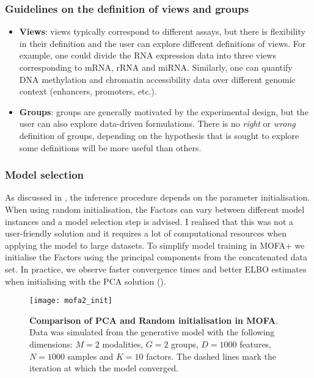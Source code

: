 \subsubsection{Guidelines on the definition of views and groups} \label{section:mofa2_guidelines_views_groups}

\begin{itemize}
	\item \textbf{Views}: views typically correspond to different assays, but there is flexibility in their definition and the user can explore different definitions of views. For example, one could divide the RNA expression data into three views corresponding to mRNA, rRNA and miRNA. Similarly, one can quantify DNA methylation and chromatin accessibility data over different genomic context (enhancers, promoters, etc.).

	\item \textbf{Groups}: groups are generally motivated by the experimental design, but the user can also explore data-driven formulations. There is no \textit{right} or \textit{wrong} definition of groups, depending on the hypothesis that is sought to explore some definitions will be more useful than others.
\end{itemize}

\subsubsection{Model selection} \label{section:mofa2_model_selection}

As discussed in , the inference procedure depends on the parameter initialisation. When using random initialisation, the Factors can vary between different model instances and a model selection step is advised. I realised that this was not a user-friendly solution and it requires a lot of computational resources when applying the model to large datasets. To simplify model training in MOFA+ we initialise the Factors using the principal components from the concatenated data set. In practice, we observe faster convergence times and better ELBO estimates when initialising with the PCA solution ().

\begin{figure}[H]
	\centering
	\texttt{[image: mofa2\_init]}
	\caption[]{
	\textbf{Comparison of PCA and Random initialisation in MOFA}.\\ Data was simulated from the generative model with the following dimensions: $M=2$ modalities, $G=2$ groups, $D=1000$ features, $N=1000$ samples and $K=10$ factors. The dashed lines mark the iteration at which the model converged.
	}
	\label{fig:mofa2_init}
\end{figure}

